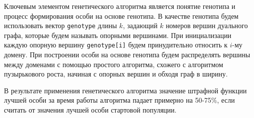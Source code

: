 \documentclass[a4paper,14pt]{extarticle}                     %
\theoremstyle{plain}                                         %
\begin{document}
Ключевым элементом генетического алгоритма является понятие генотипа и процесс формирования особи на основе генотипа.
В качестве генотипа будем использовать вектор \texttt{genotype} длины $k$, задающий $k$ номеров вершин дуального графа, которые будем называть опорными вершинами.
При инициализации каждую опорную вершину \texttt{genotype[i]} будем принудительно относить к $i$-му домену.
При построении особи на основе генотипа будем распределять вершины между доменами с помощью простого алгоритма, схожего с алгоритмом пузырькового роста, начиная с опорных вершин и обходя граф в ширину.

В результате применения генетического алгоритма значение штрафной функции лучшей особи за время работы алгоритма падает примерно на 50-75\%, если считать от значения лучшей особи стартовой популяции.



\end{document}
